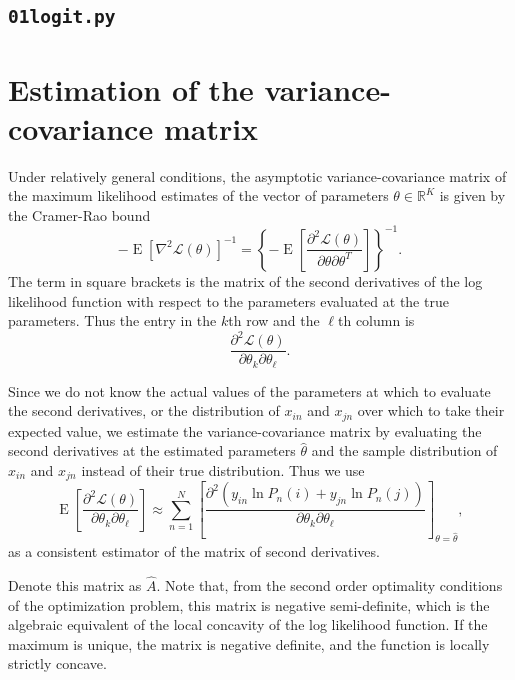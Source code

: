 \documentclass[12pt,a4paper]{article}
\newcommand{\R}{\mathbb{R}}
\renewcommand{\L}{\mathcal{L}}
\newcommand{\expect}{\operatorname{E}}
\newcommand*{\examplesPath}{../examples}
\begin{document}
\subsection{\lstinline$01logit.py$}
\label{sec:modelPython}


\clearpage

   \section{Estimation of the  variance-covariance matrix}
   \label{sec:robust}
Under relatively general conditions,  the asymptotic
variance-covariance matrix of the maximum likelihood
estimates of the vector of parameters $\theta \in \R^K$ is given by the Cramer-Rao bound
\begin{equation}
  \label{eq:RaoCramer}
  -\expect\left[ \nabla^2 \L(\theta)\right]^{-1} =  \left\{-\expect\left[\frac{\partial^2 \L(\theta)}{\partial \theta \partial \theta^T}\right]\right\}^{-1}.
\end{equation}
The term in square brackets is the matrix of the second derivatives
of the log likelihood function with respect to the parameters
evaluated at the true parameters.  Thus the entry in the $k$\/th row and
the $\ell$\/th column is
\begin{equation}
  \label{eq:BAL4.34}
 \frac{\partial^2 \L(\theta)}{\partial \theta_k \partial \theta_{\ell}}.
\end{equation}

Since we do not know the actual values of the parameters at which to
evaluate the second derivatives, or the distribution of $x_{in}$ and
$x_{jn}$ over which to take their expected value, we estimate the
variance-covariance matrix by evaluating the second derivatives  at the estimated parameters
$\hat{\theta}$ and the sample distribution of $x_{in}$ and $x_{jn}$ instead of
 their true distribution. Thus we use
\begin{equation}
  \label{eq:BAL4.35}
  \expect\left[\frac{\partial^2 \L(\theta)}{\partial \theta_k \partial \theta_\ell}  \right]\approx \sum_{n=1}^N \left[\frac{\partial^2\left(y_{in}\ln P_n(i) + y_{jn} \ln P_n(j) \right)}{\partial \theta_k \partial \theta_\ell} \right]_{\theta=\hat{\theta}},
\end{equation}
as a consistent estimator of the matrix of second derivatives. 

Denote
this matrix as $\hat{A}$. Note that, from the second order optimality conditions of the optimization
problem, this matrix is negative semi-definite, which is the algebraic equivalent of the local  concavity of the
log likelihood function.
 If the maximum is unique, the matrix is negative definite, and the
 function is locally strictly concave. 
\end{document}
